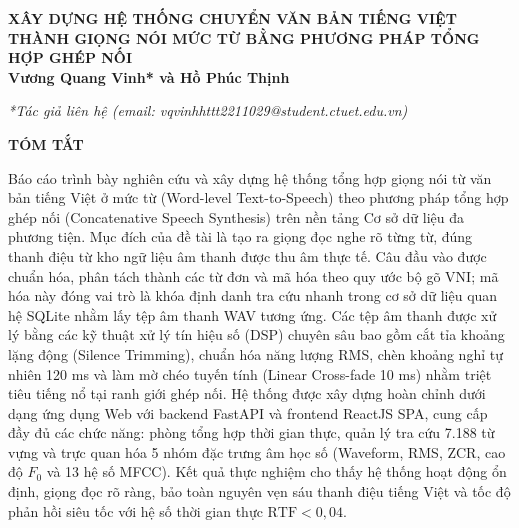 \documentclass[13pt,a4paper]{extarticle}
\begin{document}
\setcounter{page}{1}

\begin{center}
    {\fontsize{13}{16}\selectfont \textbf{XÂY DỰNG HỆ THỐNG CHUYỂN VĂN BẢN TIẾNG VIỆT THÀNH GIỌNG NÓI MỨC TỪ BẰNG PHƯƠNG PHÁP TỔNG HỢP GHÉP NỐI}}\\[10pt]
    {\fontsize{13}{16}\selectfont \textbf{Vương Quang Vinh* và Hồ Phúc Thịnh}}\\[6pt]
\end{center}
\begin{flushright}
    {\fontsize{11}{14}\selectfont \textit{*Tác giả liên hệ (email: vqvinhhttt2211029@student.ctuet.edu.vn)}}
\end{flushright}
\vspace{6pt}

\noindent\textbf{TÓM TẮT}\par
Báo cáo trình bày nghiên cứu và xây dựng hệ thống tổng hợp giọng nói từ văn bản tiếng Việt ở mức từ (Word-level Text-to-Speech) theo phương pháp tổng hợp ghép nối (Concatenative Speech Synthesis) trên nền tảng Cơ sở dữ liệu đa phương tiện. Mục đích của đề tài là tạo ra giọng đọc nghe rõ từng từ, đúng thanh điệu từ kho ngữ liệu âm thanh được thu âm thực tế. Câu đầu vào được chuẩn hóa, phân tách thành các từ đơn và mã hóa theo quy ước bộ gõ VNI; mã hóa này đóng vai trò là khóa định danh tra cứu nhanh trong cơ sở dữ liệu quan hệ SQLite nhằm lấy tệp âm thanh WAV tương ứng. Các tệp âm thanh được xử lý bằng các kỹ thuật xử lý tín hiệu số (DSP) chuyên sâu bao gồm cắt tỉa khoảng lặng động (Silence Trimming), chuẩn hóa năng lượng RMS, chèn khoảng nghỉ tự nhiên 120 ms và làm mờ chéo tuyến tính (Linear Cross-fade 10 ms) nhằm triệt tiêu tiếng nổ tại ranh giới ghép nối. Hệ thống được xây dựng hoàn chỉnh dưới dạng ứng dụng Web với backend FastAPI và frontend ReactJS SPA, cung cấp đầy đủ các chức năng: phòng tổng hợp thời gian thực, quản lý tra cứu 7.188 từ vựng và trực quan hóa 5 nhóm đặc trưng âm học số (Waveform, RMS, ZCR, cao độ $F_0$ và 13 hệ số MFCC). Kết quả thực nghiệm cho thấy hệ thống hoạt động ổn định, giọng đọc rõ ràng, bảo toàn nguyên vẹn sáu thanh điệu tiếng Việt và tốc độ phản hồi siêu tốc với hệ số thời gian thực $\text{RTF} < 0{,}04$.
\end{document}
